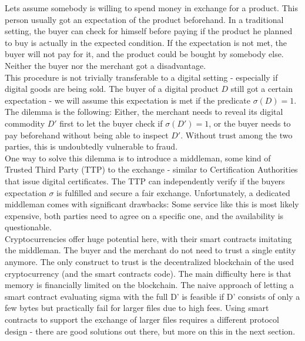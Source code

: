 \documentclass{cacthesis}
\newcounter{protocol}
\begin{document}
        Lets assume somebody is willing to spend money in exchange for a product. This person usually got an expectation of the product beforehand. In a traditional setting, the buyer can check for himself before paying if the product he planned to buy is actually in the expected condition. If the expectation is not met, the buyer will not pay for it, and the product could be bought by somebody else. Neither the buyer nor the merchant got a disadvantage. \\
        This procedure is not trivially transferable to a digital setting - especially if digital goods are being sold. The buyer of a digital product $D$ still got a certain expectation - we will assume this expectation is met if the predicate $\sigma\left( D\right) =1$. The dilemma is the following: Either, the merchant needs to reveal its digital commodity $D'$ first to let the buyer check if $\sigma\left( D'\right) =1$, or the buyer needs to pay beforehand without being able to inspect $D'$. Without trust among the two parties, this is undoubtedly vulnerable to fraud. \\ 
        One way to solve this dilemma is to introduce a middleman, some kind of Trusted Third Party (TTP) to the exchange - similar to Certification Authorities that issue digital certificates. The TTP can independently verify if the buyers expectation $\sigma$ is fulfilled and secure a fair exchange. Unfortunately, a dedicated middleman comes with significant drawbacks: Some service like this is most likely expensive, both parties need to agree on a specific one, and the availability is questionable. \\
        Cryptocurrencies offer huge potential here, with their smart contracts imitating the middleman. The buyer and the merchant do not need to trust a single entity anymore. The only construct to trust is the decentralized blockchain of the used cryptocurrency (and the smart contracts code). The main difficulty here is that memory is financially limited on the blockchain. The naive approach of letting a smart contract evaluating sigma with the full D' is feasible if D' consists of only a few bytes but practically fail for larger files due to high fees. Using smart contracts to support the exchange of larger files requires a different protocol design - there are good solutions out there, but more on this in the next section. \\ 
\end{document}
